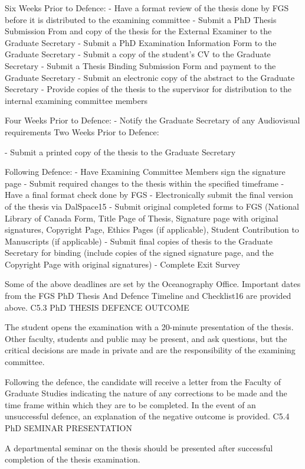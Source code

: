 \documentclass{article}
\begin{document}
Six Weeks Prior to Defence:
-	Have a format review of the thesis done by FGS before it is distributed to the examining committee
-	Submit a PhD Thesis Submission From and copy of the thesis for the External Examiner to the Graduate Secretary
-	Submit a PhD Examination Information Form to the Graduate Secretary
-	Submit a copy of the student’s CV to the Graduate Secretary
-	Submit a Thesis Binding Submission Form and payment to the Graduate Secretary
-	Submit an electronic copy of the abstract to the Graduate Secretary
-	Provide copies of the thesis to the supervisor for distribution to the internal examining committee members

Four Weeks Prior to Defence:
-	Notify the Graduate Secretary of any Audiovisual requirements Two Weeks Prior to Defence:
 

-	Submit a printed copy of the thesis to the Graduate Secretary

Following Defence:
-	Have Examining Committee Members sign the signature page
-	Submit required changes to the thesis within the specified timeframe
-	Have a final format check done by FGS
-	Electronically submit the final version of the thesis via DalSpace15
-	Submit original completed forms to FGS (National Library of Canada Form, Title Page of Thesis, Signature page with original signatures, Copyright Page, Ethics Pages (if applicable), Student Contribution to Manuscripts (if applicable)
-	Submit final copies of thesis to the Graduate Secretary for binding (include copies of the signed signature page, and the Copyright Page with original signatures)
-	Complete Exit Survey

Some of the above deadlines are set by the Oceanography Office. Important dates from the FGS PhD Thesis And Defence Timeline and Checklist16 are provided above.
C5.3	PhD THESIS DEFENCE OUTCOME

The student opens the examination with a 20-minute presentation of the thesis. Other faculty, students and public may be present, and ask questions, but the critical decisions are made in private and are the responsibility of the examining committee.

Following the defence, the candidate will receive a letter from the Faculty of Graduate Studies indicating the nature of any corrections to be made and the time frame within which they are to be completed.  In the event of an unsuccessful defence, an explanation of the negative outcome is provided.
C5.4	PhD SEMINAR PRESENTATION

A departmental seminar on the thesis should be presented after successful completion of the thesis examination.
\end{document}
